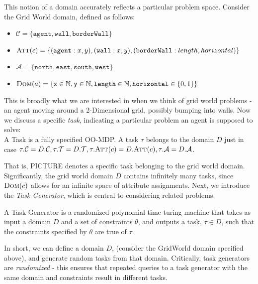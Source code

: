 \documentclass[11pt]{article}
\begin{document}

This notion of a domain accurately reflects a particular problem space. Consider the Grid World domain, defined as follows:
\begin{itemize}
\item $\mathcal{C} = \{\texttt{agent}, \texttt{wall}, \texttt{borderWall}\}$
\item $\textsc{Att}(c) = \{(\texttt{agent} : x, y), (\texttt{wall} : x, y), (\texttt{borderWall} : length, horizontal)\}$
\item $\mathcal{A} = \{\texttt{north}, \texttt{east}, \texttt{south}, \texttt{west}\}$
\item $\textsc{Dom}(a) = \{\texttt{x} \in \mathbb{N}, \texttt{y} \in \mathbb{N},  \texttt{length} \in \mathbb{N}, \texttt{horizontal} \in \{0,1\}\}$
\end{itemize}

This is broadly what we are interested in when we think of grid world problems - an agent moving around a 2-Dimensional grid, possibly bumping into walls. Now we discuss a specific {\it task}, indicating a particular problem an agent is supposed to solve: \\

{ A \textup{Task} is a fully specified OO-MDP. A task $\tau$ belongs to the domain $D$ just in case $\tau.\mathcal{C} = D.\mathcal{C}, \tau.\mathcal{T} = D.\mathcal{T}, \tau.\textsc{Att}(c) = D.\textsc{Att}(c), \tau.\mathcal{A} = D.\mathcal{A}$}.


That is, PICTURE denotes a specific task belonging to the grid world domain. Significantly, the grid world domain $D$ contains infinitely many tasks, since $\textsc{Dom}(c)$ allows for an infinite space of attribute assignments. Next, we introduce the {\it Task Generator}, which is central to considering related problems.

{ A \textup{Task Generator} is a randomized polynomial-time turing machine that takes as input a domain $D$ and a set of constraints $\theta$, and outputs a task, $\tau \in D$, such that the constraints specified by $\theta$ are true of $\tau$.}

In short, we can define a domain $D$, (consider the GridWorld domain specified above), and generate random tasks from that domain. Critically, task generators are {\it randomized} - this ensures that repeated queries to a task generator with the same domain and constraints result in different tasks.
\end{document}
